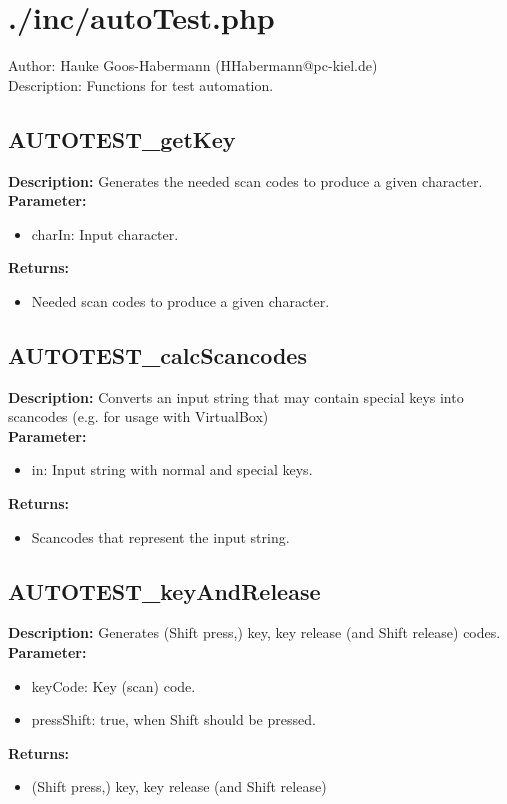 \newpage\section{./inc/autoTest.php}
 Author: Hauke Goos-Habermann (HHabermann@pc-kiel.de)\\
 Description: Functions for test automation.\\

\subsection{AUTOTEST\_getKey}
\textbf{Description:} Generates the needed scan codes to produce a given character.\\
\textbf{Parameter:}
\begin{itemize}
\item charIn: Input character.
\end{itemize}
\textbf{Returns:}
\begin{itemize}
\item Needed scan codes to produce a given character.
\end{itemize}

\subsection{AUTOTEST\_calcScancodes}
\textbf{Description:} Converts an input string that may contain special keys into scancodes (e.g. for usage with VirtualBox)\\
\textbf{Parameter:}
\begin{itemize}
\item in: Input string with normal and special keys.
\end{itemize}
\textbf{Returns:}
\begin{itemize}
\item Scancodes that represent the input string.
\end{itemize}

\subsection{AUTOTEST\_keyAndRelease}
\textbf{Description:} Generates (Shift press,) key, key release (and Shift release) codes.\\
\textbf{Parameter:}
\begin{itemize}
\item keyCode: Key (scan) code.
\item pressShift: true, when Shift should be pressed.
\end{itemize}
\textbf{Returns:}
\begin{itemize}
\item (Shift press,) key, key release (and Shift release)
\end{itemize}

